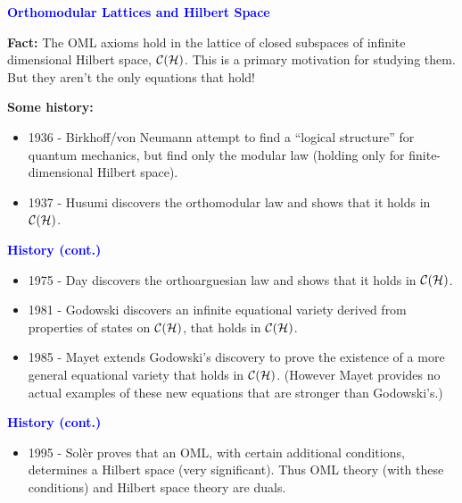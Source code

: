 \documentclass{slides}
\begin{document}
\begin{slide}
\textcolor{blue}{\textbf{Orthomodular Lattices and Hilbert Space}}

\textbf{Fact:} The OML axioms hold in the lattice of closed subspaces of
infinite dimensional Hilbert space,
\textcolor{red}{${\cal C}({\cal H})$}.  This is a primary motivation for
studying them.  But they aren't the only equations that hold!

\textbf{Some history:}
\begin{itemize}
\item 1936 - Birkhoff/von Neumann attempt to find a ``logical structure''
  for quantum mechanics, but find only the modular law (holding only
  for finite-dimensional Hilbert space).
\item 1937 - Husumi discovers the orthomodular law and
  shows that it holds in ${\cal C}({\cal H})$.
\end{itemize}

\end{slide}
\begin{slide}
\textcolor{blue}{\textbf{History (cont.)}}

\begin{itemize}
\item 1975 - Day discovers the orthoarguesian law and shows that it
  holds in ${\cal C}({\cal H})$.
\item 1981 - Godowski discovers an infinite equational variety
derived from properties of
 states on ${\cal C}({\cal H})$, that holds
in ${\cal C}({\cal H})$.
\item 1985 - Mayet extends Godowski's discovery to prove the existence
of a more general equational variety that
  holds in ${\cal C}({\cal H})$.  (However Mayet
provides no actual examples of these new equations that are stronger than
Godowski's.)
\end{itemize}

\end{slide}

\begin{slide}


\textcolor{blue}{\textbf{History (cont.)}}

\begin{itemize}
\item 1995 - Sol\`er proves that an OML, with certain additional conditions,
determines a Hilbert space (very significant).  Thus OML theory (with
these conditions) and
Hilbert space theory are duals.
\end{itemize}

\end{slide}
\end{document}
